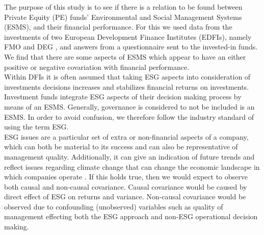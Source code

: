 \documentclass[twoside,12pt]{article}
\let\oldmarginpar\marginpar
\renewcommand\marginpar[1]{\-\oldmarginpar[\raggedleft\footnotesize #1]
{\raggedright\footnotesize #1}}
\begin{document}
\marginpar{purpose} The purpose of this study is to see if there is a relation to be found between Private Equity (PE) funds' Environmental and Social Management Systems (ESMS), and their financial performance. For this we used data from the investments of two European Development Finance Institutes (EDFIs), namely FMO  and DEG , and answers from a questionnaire sent to the invested-in funds. We find that there are some aspects of ESMS which appear to have an either positive or negative covariation with financial performance.\\

\marginpar{background} Within DFIs it is often assumed that taking ESG aspects into consideration of investments decisions increases and stabilizes financial returns on investments. Investment funds integrate ESG aspects of their decision making process by means of an ESMS. Generally, governance is considered to not be included is an ESMS. In order to avoid confusion, we therefore follow the industry standard of using the term ESG.  \\

ESG issues are a particular set of extra or non-financial aspects of a company, which can both be material to its success and can also be representative of management quality. Additionally, it can give an indication of future trends and reflect issues regarding climate change that can change the economic landscape in which companies operate \parencite[cf.][1]{llewellyn2007business}. 
If this holds true, then we would expect to observe both causal and non-causal covariance.
Causal covariance would be caused by direct effect of ESG on returns and variance.
Non-causal covariance would be observed due to confounding (unobserved) variables such as quality of management effecting both the ESG approach and non-ESG operational decision making.
\end{document}

